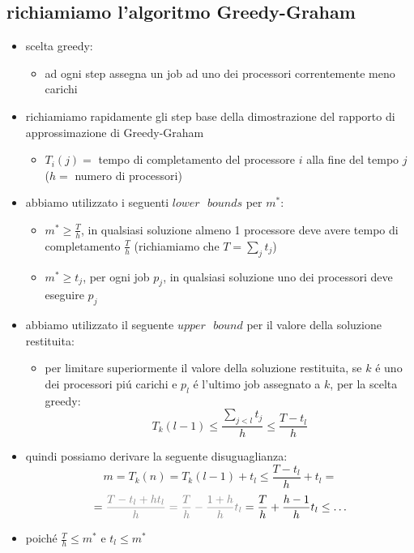 \subsection*{richiamiamo l'algoritmo Greedy-Graham}
\begin{flushleft}
	\begin{itemize}
		\item scelta greedy:
		\begin{itemize}
			\item ad ogni step assegna un job ad uno dei processori correntemente meno carichi
		\end{itemize}
		\item richiamiamo rapidamente gli step base della dimostrazione del rapporto di approssimazione di Greedy-Graham
		\begin{itemize}
			\item $T_i(j)=$ tempo di completamento del processore $i$ alla fine del tempo $j$ ($h=$ numero di processori)
		\end{itemize}
		\item abbiamo utilizzato i seguenti $lower\text{ }bounds$ per $m^*$:
		\begin{itemize}
			\item $m^*\geq\frac{T}{h}$, in qualsiasi soluzione almeno 1 processore deve avere tempo di completamento $\frac{T}{h}$ (richiamiamo che $T=\sum_j t_j$)
			\item $m^*\geq t_j$, per ogni job $p_j$, in qualsiasi soluzione uno dei processori deve eseguire $p_j$
		\end{itemize}
		\item abbiamo utilizzato il seguente $upper\text{ }bound$ per il valore della soluzione restituita:
		\begin{itemize}
			\item per limitare superiormente il valore della soluzione restituita, se $k$ \'e uno dei processori pi\'u carichi e $p_l$ \'e l'ultimo job assegnato a $k$, per la scelta greedy:
				$$T_k(l-1)\leq\frac{\sum_{j<l}t_j}{h}\leq\frac{T-t_l}{h}$$
		\end{itemize}
		\item quindi possiamo derivare la seguente disuguaglianza:
			$$m=T_k(n)=T_k(l-1)+t_l\leq\frac{T-t_l}{h}+t_l=$$
			$$=\color{gray}\frac{T-t_l+ht_l}{h}=\frac{T}{h}-\frac{1+h}{h}t_l\color{black}=\frac{T}{h}+\frac{h-1}{h}t_l\leq\ldots$$
		\item poich\'e $\frac{T}{h}\leq m^*$ e $t_l\leq m^*$

\end{itemize}
\end{flushleft}
